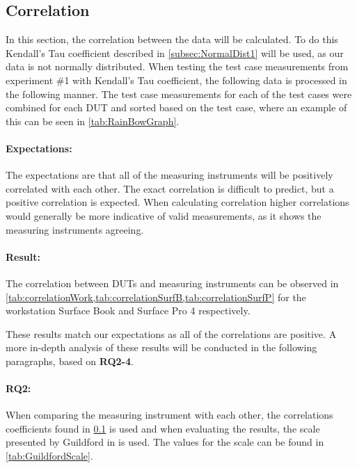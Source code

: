 \subsection{Correlation}\label{subsec:correlation1}
In this section, the correlation between the data will be calculated. To do this Kendall's Tau coefficient\cite{kendall1938new} described in \cref{subsec:NormalDist1} will be used, as our data is not normally distributed. When testing the test case measurements from experiment \#1 with Kendall's Tau coefficient, the following data is processed in the following manner. The test case measurements for each of the test cases were combined for each DUT and sorted based on the test case, where an example of this can be seen in \cref{tab:RainBowGraph}.



\paragraph{Expectations:} The expectations are that all of the measuring instruments will be positively correlated with each other. The exact correlation is difficult to predict, but a positive correlation is expected. When calculating correlation higher correlations would generally be more indicative of valid measurements, as it shows the measuring instruments agreeing.

\paragraph{Result:} The correlation between DUTs and measuring instruments can be observed in \cref{tab:correlationWork,tab:correlationSurfB,tab:correlationSurfP} for the workstation Surface Book and Surface Pro 4 respectively.




These results match our expectations as all of the correlations are positive. A more in-depth analysis of these results will be conducted in the following paragraphs, based on \textbf{RQ2-4}.

\paragraph{RQ2:} When comparing the measuring instrument with each other, the correlations coefficients found in \cref{subsec:correlation1} is used and when evaluating the results, the scale presented by Guildford in \cite[219]{guilford1950fundamental} is used. The values for the scale can be found in \cref{tab:GuildfordScale}.


